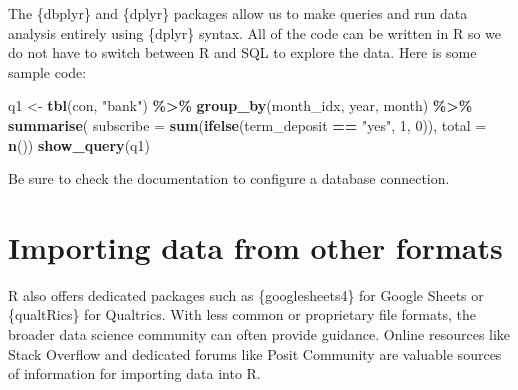 \documentclass[
]{krantz}
\makeatletter
\newenvironment{Shaded}{\begin{snugshade}}{\end{snugshade}}
\newcommand{\AttributeTok}[1]{\textcolor[rgb]{0.27,0.27,0.27}{#1}}
\newcommand{\DecValTok}[1]{\textcolor[rgb]{0.06,0.06,0.06}{#1}}
\newcommand{\FunctionTok}[1]{\textcolor[rgb]{0.27,0.27,0.27}{\textbf{#1}}}
\newcommand{\NormalTok}[1]{#1}
\newcommand{\OtherTok}[1]{\textcolor[rgb]{0.37,0.37,0.37}{#1}}
\newcommand{\SpecialCharTok}[1]{\textcolor[rgb]{0.43,0.43,0.43}{\textbf{#1}}}
\newcommand{\StringTok}[1]{\textcolor[rgb]{0.5,0.5,0.5}{#1}}
\newenvironment{kframe}{%
\medskip{}
\setlength{\fboxsep}{.8em}
 \def\at@end@of@kframe{}%
 \ifinner\ifhmode%
  \def\at@end@of@kframe{\end{minipage}}%
  \begin{minipage}{\columnwidth}%
 \fi\fi%
 \def\FrameCommand##1{\hskip\@totalleftmargin \hskip-\fboxsep
 \colorbox{shadecolor}{##1}\hskip-\fboxsep
     \hskip-\linewidth \hskip-\@totalleftmargin \hskip\columnwidth}%
 \MakeFramed {\advance\hsize-\width
   \@totalleftmargin\z@ \linewidth\hsize
   \@setminipage}}%
 {\par\unskip\endMakeFramed%
 \at@end@of@kframe}
\renewenvironment{Shaded}{\begin{kframe}}{\end{kframe}}
\makeatother
\begin{document}
The \{dbplyr\} and \{dplyr\} packages allow us to make queries and run data analysis entirely using \{dplyr\} syntax. All of the code can be written in R so we do not have to switch between R and SQL to explore the data. Here is some sample code:

\begin{Shaded}
\begin{Highlighting}[]
\NormalTok{q1 }\OtherTok{\textless{}{-}} \FunctionTok{tbl}\NormalTok{(con, }\StringTok{"bank"}\NormalTok{) }\SpecialCharTok{\%\textgreater{}\%}
  \FunctionTok{group\_by}\NormalTok{(month\_idx, year, month) }\SpecialCharTok{\%\textgreater{}\%}
  \FunctionTok{summarise}\NormalTok{(}
    \AttributeTok{subscribe =} \FunctionTok{sum}\NormalTok{(}\FunctionTok{ifelse}\NormalTok{(term\_deposit }\SpecialCharTok{==} \StringTok{"yes"}\NormalTok{, }\DecValTok{1}\NormalTok{, }\DecValTok{0}\NormalTok{)),}
    \AttributeTok{total =} \FunctionTok{n}\NormalTok{())}
\FunctionTok{show\_query}\NormalTok{(q1)}
\end{Highlighting}
\end{Shaded}

Be sure to check the documentation to configure a database connection.

\hypertarget{importing-data-from-other-formats}{%
\section{Importing data from other formats}\label{importing-data-from-other-formats}}

R also offers dedicated packages such as \{googlesheets4\} for Google Sheets or \{qualtRics\} for Qualtrics. With less common or proprietary file formats, the broader data science community can often provide guidance. Online resources like Stack Overflow and dedicated forums like Posit Community are valuable sources of information for importing data into R.

  

\backmatter
\printindex
\end{document}
